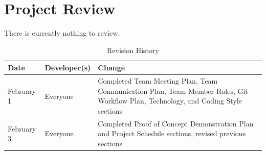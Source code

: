 \documentclass{article}
\begin{document}
\clearpage

\section{Project Review}

There is currently nothing to review.

\newpage

\begin{table}[hp]
\caption{Revision History} \label{TblRevisionHistory}
\begin{tabularx}{\textwidth}{llX}
\toprule
\textbf{Date} & \textbf{Developer(s)} & \textbf{Change}\\
\midrule
February 1 & Everyone & Completed Team Meeting Plan, Team Communication Plan, Team Member Roles, Git Workflow Plan, Technology, and Coding Style sections \\
February 3 & Everyone & Completed Proof of Concept Demonstration Plan and Project Schedule sections, revised previous sections \\ 
\bottomrule
\end{tabularx}
\end{table}
\end{document}
